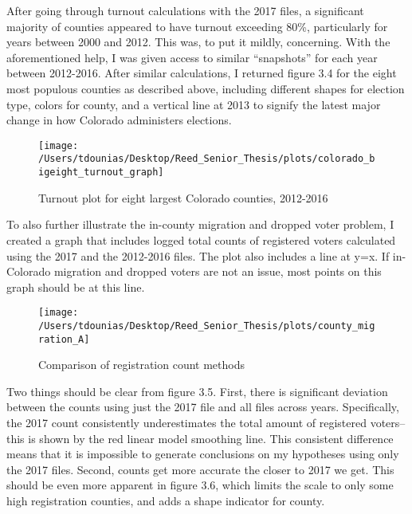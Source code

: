 \documentclass[12pt,twoside]{reedthesis}
\begin{document}
  After going through turnout calculations with the 2017 files, a
  significant majority of counties appeared to have turnout exceeding
  80\%, particularly for years between 2000 and 2012. This was, to put it
  mildly, concerning. With the aforementioned help, I was given access to
  similar ``snapshots'' for each year between 2012-2016. After similar
  calculations, I returned figure 3.4 for the eight most populous counties
  as described above, including different shapes for election type, colors
  for county, and a vertical line at 2013 to signify the latest major
  change in how Colorado administers elections.
  
  \begin{figure}
  
  {\centering \texttt{[image: /Users/tdounias/Desktop/Reed\_Senior\_Thesis/plots/colorado\_bigeight\_turnout\_graph]} 
  
  }
  
  \caption[Turnout plot for eight largest Colorado counties, 2012-2016]{Turnout plot for eight largest Colorado counties, 2012-2016}\label{fig:big eight turnout plot}
  \end{figure}
  
  To also further illustrate the in-county migration and dropped voter
  problem, I created a graph that includes logged total counts of
  registered voters calculated using the 2017 and the 2012-2016 files. The
  plot also includes a line at y=x. If in-Colorado migration and dropped
  voters are not an issue, most points on this graph should be at this
  line.
  
  \begin{figure}
  
  {\centering \texttt{[image: /Users/tdounias/Desktop/Reed\_Senior\_Thesis/plots/county\_migration\_A]} 
  
  }
  
  \caption[Comparison of registration count methods]{Comparison of registration count methods}\label{fig:county migration A}
  \end{figure}
  
  Two things should be clear from figure 3.5. First, there is significant
  deviation between the counts using just the 2017 file and all files
  across years. Specifically, the 2017 count consistently underestimates
  the total amount of registered voters--this is shown by the red linear
  model smoothing line. This consistent difference means that it is
  impossible to generate conclusions on my hypotheses using only the 2017
  files. Second, counts get more accurate the closer to 2017 we get. This
  should be even more apparent in figure 3.6, which limits the scale to
  only some high registration counties, and adds a shape indicator for
  county.
  
\end{document}
